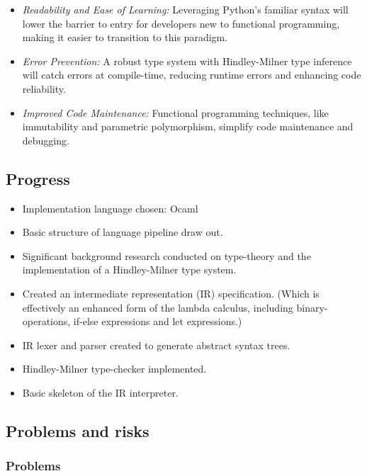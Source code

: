 \documentclass[11pt]{article}
\begin{document}
    \begin{itemize}
        \item \emph{Readability and Ease of Learning:} Leveraging Python's familiar syntax will lower the barrier to entry for developers new to functional programming, making it easier to transition to this paradigm.
        \item \emph{Error Prevention:} A robust type system with Hindley-Milner type inference will catch errors at compile-time, reducing runtime errors and enhancing code reliability.
        \item \emph{Improved Code Maintenance:} Functional programming techniques, like immutability and parametric polymorphism, simplify code maintenance and debugging.
    \end{itemize}

\subsection{Progress}\label{progress}

\begin{itemize}
    \item Implementation language chosen: Ocaml
    \item Basic structure of language pipeline draw out.
    \item Significant background research conducted on type-theory and the implementation of a Hindley-Milner type system.
    \item Created an intermediate representation (IR) specification. (Which is effectively an enhanced form of the lambda calculus, including binary-operations, if-else expressions and let expressions.)
    \item IR lexer and parser created to generate abstract syntax trees.
    \item Hindley-Milner type-checker implemented.
    \item Basic skeleton of the IR interpreter.
\end{itemize}

\subsection{Problems and risks}\label{problems-and-risks}

\subsubsection{Problems}\label{problems}
\end{document}
